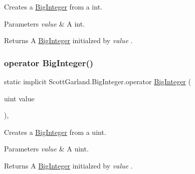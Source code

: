 Creates a \hyperlink{class_scott_garland_1_1_big_integer}{Big\+Integer} from a int. 


\begin{DoxyParams}{Parameters}
{\em value} & A int.\\
\hline
\end{DoxyParams}
\begin{DoxyReturn}{Returns}
A \hyperlink{class_scott_garland_1_1_big_integer}{Big\+Integer} initialzed by {\itshape value} .
\end{DoxyReturn}
\mbox{\label{class_scott_garland_1_1_big_integer_a4058c6d81e843425ed6b1ceb98706abe}} 
\subsubsection{\texorpdfstring{operator Big\+Integer()}{operator BigInteger()}\hspace{0.1cm}{\footnotesize\ttfamily [4/4]}}
{\footnotesize\ttfamily static implicit Scott\+Garland.\+Big\+Integer.\+operator \hyperlink{class_scott_garland_1_1_big_integer}{Big\+Integer} (\begin{DoxyParamCaption}\item[{uint}]{value }\end{DoxyParamCaption})\hspace{0.3cm}{\ttfamily [inline]}, {\ttfamily [static]}}



Creates a \hyperlink{class_scott_garland_1_1_big_integer}{Big\+Integer} from a uint. 


\begin{DoxyParams}{Parameters}
{\em value} & A uint.\\
\hline
\end{DoxyParams}
\begin{DoxyReturn}{Returns}
A \hyperlink{class_scott_garland_1_1_big_integer}{Big\+Integer} initialzed by {\itshape value} .
\end{DoxyReturn}
\mbox{\label{class_scott_garland_1_1_big_integer_a6660cf490e242eed91928fca289e7b7f}} 

